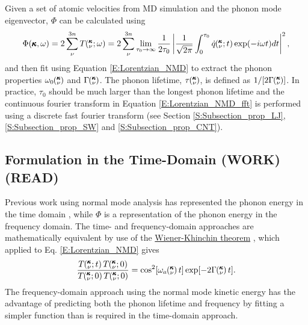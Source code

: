 Given a set of atomic velocities 
from MD simulation and the phonon mode eigenvector, $\Phi$ can be 
calculated using
\begin{equation}\label{E:Lorentzian_NMD_fft}
\begin{split}
\Phi(\pmb{\kappa},\omega) = 2\sum_{\nu}^{3n} T\mspace{-4.0mu}\left(\mspace{-8.0mu} \begin{smallmatrix}&\pmb{\kappa} \\&\nu\end{smallmatrix} \mspace{-2.0mu};\omega\right)=2\sum_{\nu}^{3n} 
\lim_{\tau_0\rightarrow\infty}\frac{1}{2\tau_0}\left|
\frac{1}{\sqrt{2\pi}}\int_{0}^{\tau_0}\dot{q}\mspace{-4.0mu}\left(\mspace{-8.0mu} \begin{smallmatrix}&\pmb{\kappa} \\&\nu\end{smallmatrix} \mspace{-2.0mu};t\right)
\exp(-i\omega t)dt\right|^2,
\end{split}
\end{equation}
and then fit using 
Equation \eqref{E:Lorentzian_NMD} to extract the phonon properties 
$\omega_0\mspace{-4.0mu}\left(\mspace{-8.0mu} \begin{smallmatrix}&\pmb{\kappa} \\&\nu\end{smallmatrix} \mspace{-3.0mu}\right)$ and $\Gamma\mspace{-4.0mu}\left(\mspace{-8.0mu} \begin{smallmatrix}&\pmb{\kappa} \\&\nu\end{smallmatrix} \mspace{-3.0mu}\right)$. 
The phonon lifetime, $\tau \mspace{-4.0mu}\left(\mspace{-8.0mu} \begin{smallmatrix}&\pmb{\kappa} \\&\nu\end{smallmatrix} \mspace{-3.0mu}\right)$, is defined as $1/[2 \Gamma \mspace{-4.0mu}\left(\mspace{-8.0mu} \begin{smallmatrix}&\pmb{\kappa} \\&\nu\end{smallmatrix} \mspace{-3.0mu}\right)]$. 
In practice, $\tau_0$ should 
be much larger than the longest phonon lifetime and the continuous 
fourier transform in 
Equation \eqref{E:Lorentzian_NMD_fft}  
is performed using a discrete fast fourier transform (see Section 
\ref{S:Subsection_prop_LJ}, 
\ref{S:Subsection_prop_SW} and \ref{S:Subsection_prop_CNT}).

\subsection{\label{S:Subsection_SED_time-domain}Formulation in the 
Time-Domain (WORK) (READ)}

Previous work using normal mode analysis has represented the phonon 
energy in the time domain 
\cite{ladd_lattice_1986,mcgaughey_quantitative_2004,
henry_spectral_2008,turney_predicting_2009,
goicochea_thermal_2010,he_thermal_2011}, while $\Phi$ is a 
representation of the phonon energy in the frequency domain. The 
time- and frequency-domain 
approaches are mathematically equivalent by use of the 
\href{http://en.wikipedia.org/wiki/Wiener\%E2\%80\%93Khinchin_theorem}
{Wiener-Khinchin theorem} 
\cite{rudin_real_1987,shiomi_thermal_2011}, which applied to Eq. 
\eqref{E:Lorentzian_NMD} gives 
\begin{equation}\label{E:xcorr_NMD}
\begin{split}
\frac{T\kvt T\kvzero}{T \kvzero T\kvzero} =\cos^2[\omega_a \kv t] 
\exp[-2 \Gamma \kv t].
\end{split}
\end{equation}
The frequency-domain approach using the normal mode kinetic 
energy has the advantage of predicting both the phonon lifetime 
and frequency by fitting a simpler function than is required in the 
time-domain approach.

